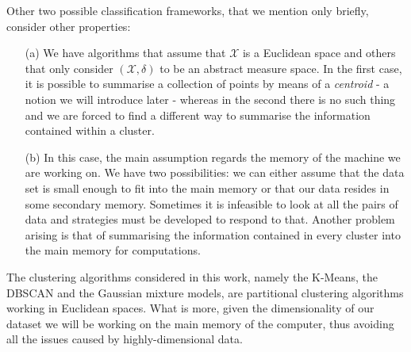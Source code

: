 \documentclass[a4paper]{article}
\begin{document}
	Other two possible classification frameworks, that we mention only briefly, consider other properties:
	\begin{enumerate}
		\item[(a)] We have algorithms that assume that $\mathcal{X}$ is a Euclidean space and others that only consider $\left( \mathcal{X}, \delta \right)$ to be an abstract measure space. In the first case, it is possible to summarise a collection of points by means of a \textit{centroid} - a notion we will introduce later - whereas in the second there is no such thing and we are forced to find a different way to summarise the information contained within a cluster.
		\item[(b)] In this case, the main assumption regards the memory of the machine we are working on. We have two possibilities: we can either assume that the data set is small enough to fit into the main memory or that our data resides in some secondary memory. Sometimes it is infeasible to look at all the pairs of data and strategies must be developed to respond to that. Another problem arising is that of summarising the information contained in every cluster into the main memory for computations.
	\end{enumerate}

	The clustering algorithms considered in this work, namely the K-Means, the DBSCAN and the Gaussian mixture models, are partitional clustering algorithms working in Euclidean spaces. What is more, given the dimensionality of our dataset we will be working on the main memory of the computer, thus avoiding all the issues caused by highly-dimensional data.
\end{document}

